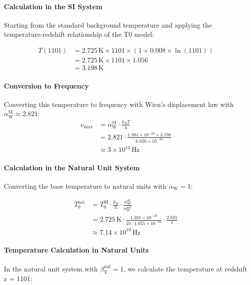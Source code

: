\documentclass[12pt,a4paper]{article}
\newcommand{\betaT}{\beta_{\text{T}}}
\newcommand{\alphaW}{\alpha_{\text{W}}}
\begin{document}
	\paragraph{Calculation in the SI System}
	Starting from the standard background temperature and applying the temperature-redshift relationship of the T0 model:
	
	\begin{align}
		T(1101) &= 2.725 \, \text{K} \times 1101 \times (1 + 0.008 \times \ln(1101)) \\
		&= 2.725 \, \text{K} \times 1101 \times 1.056 \\
		&= 3.198 \, \text{K}
	\end{align}
	
	\paragraph{Conversion to Frequency}
	Converting this temperature to frequency with Wien's displacement law with \(\alphaW^{\text{SI}} \approx 2.821\):
	\begin{align}
		\nu_{\text{max}} &= \alphaW^{\text{SI}} \cdot \frac{k_B T}{h} \\
		&= 2.821 \cdot \frac{1.381 \times 10^{-23} \times 3.198}{6.626 \times 10^{-34}} \\
		&\approx 3 \times 10^{14} \, \text{Hz}
	\end{align}
	
	\paragraph{Calculation in the Natural Unit System}
	Converting the base temperature to natural units with \(\alphaW = 1\):
	
	\begin{align}
		T_0^{\text{nat}} &= T_0^{\text{SI}} \cdot \frac{k_B}{h} \cdot \frac{\alphaW^{\text{SI}}}{\alphaW^{\text{nat}}} \\
		&= 2.725 \, \text{K} \cdot \frac{1.381 \times 10^{-23}}{2\pi \cdot 1.055 \times 10^{-34}} \cdot \frac{2.821}{1} \\
		&\approx 7.14 \times 10^{10} \, \text{Hz}
	\end{align}
	
	\paragraph{Temperature Calculation in Natural Units}
	In the natural unit system with \(\betaT^{\text{nat}} = 1\), we calculate the temperature at redshift z = 1101:
	
\end{document}

